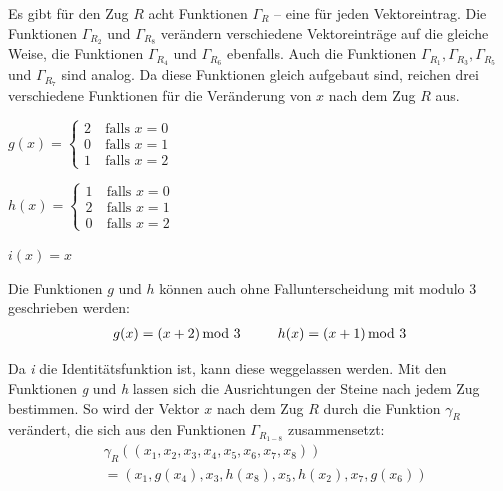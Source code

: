 \documentclass[12pt,a4paper, usenames, dvipsnames]{article}
\theoremstyle{mystyle}
\theoremstyle{definition}
\begin{document}
Es gibt für den Zug $R$ acht Funktionen $\Gamma_R$ -- eine für jeden Vektoreintrag. Die Funktionen $\Gamma_{R_2}$ und $\Gamma_{R_8}$ verändern verschiedene Vektoreinträge auf die gleiche Weise, die Funktionen $\Gamma_{R_4}$ und $\Gamma_{R_6}$ ebenfalls. Auch die Funktionen $\Gamma_{R_1}, \Gamma_{R_3}, \Gamma_{R_5}$ und $\Gamma_{R_7}$ sind analog. Da diese Funktionen gleich aufgebaut sind, reichen drei verschiedene Funktionen für die Veränderung von $x$ nach dem Zug $R$ aus.
\\

\begin{minipage}{0.35\textwidth}
\centering
$g(x)= \begin{cases}
2 & \ \text{falls } x = 0 \\ 
0 & \ \text{falls } x = 1 \\
1 & \ \text{falls } x = 2 
\end{cases}$
\end{minipage}
\begin{minipage}{0.35\textwidth}
\centering
$h(x)= \begin{cases}
1 & \ \text{falls } x = 0 \\ 
2 & \ \text{falls } x = 1 \\
0 & \ \text{falls } x = 2 
\end{cases}$
\end{minipage}
\begin{minipage}{0.3\textwidth}
\centering
$i(x) = x$
\end{minipage}
\vspace*{1em}

Die Funktionen $g$ und $h$ können auch ohne Fallunterscheidung mit modulo 3 geschrieben werden:
\begin{align*}
g(x)=(x+2) \hspace*{-0.5em} \mod 3 \ \ \ \ \ \ \ \ h(x) = (x+1) \hspace*{-0.5em} \mod 3
\end{align*}

Da \textit{i} die Identitätsfunktion ist, kann diese weggelassen werden.
Mit den Funktionen \textit{g} und \textit{h} lassen sich die Ausrichtungen der Steine nach jedem Zug bestimmen. So wird der Vektor $x$ nach dem Zug $R$ durch die Funktion $\gamma_R$ verändert, die sich aus den Funktionen $\Gamma_{R_{1-8}}$ zusammensetzt:
\begin{align*}
& \gamma_R \left( (x_1, x_2, x_3, x_4, x_5, x_6, x_7, x_8  ) \right) \\ 
& =  \left( x_1, g(x_4), x_3, h(x_8), x_5, h(x_2), x_7, g(x_6) \right)
\end{align*}
\end{document}
